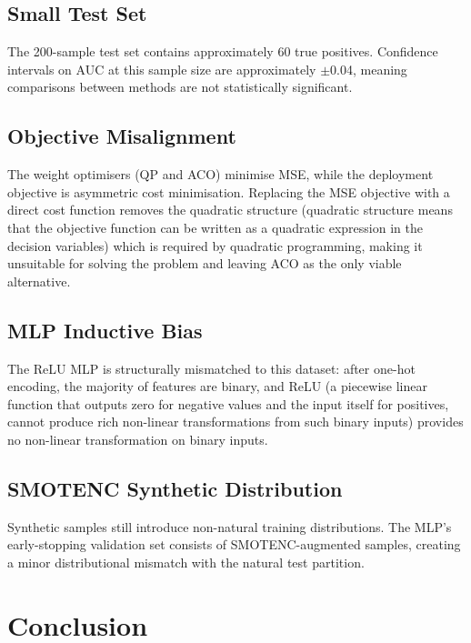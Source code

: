 \documentclass[12pt,a4paper]{article}
\begin{document}
\subsection{Small Test Set}

The 200-sample test set contains approximately 60 true positives. Confidence intervals on AUC at this sample size are approximately $\pm$0.04, meaning comparisons between methods are not statistically significant.

\subsection{Objective Misalignment}

The weight optimisers (QP and ACO) minimise MSE, while the deployment objective is asymmetric cost minimisation. Replacing the MSE objective with a direct cost function removes the quadratic structure (quadratic structure means that the objective function can be written as a quadratic expression in the decision variables) which is required by quadratic programming, making it unsuitable for solving the problem and leaving ACO as the only viable alternative.

\subsection{MLP Inductive Bias}

The ReLU MLP is structurally mismatched to this dataset: after one-hot encoding, the majority of features are binary, and ReLU (a piecewise linear function that outputs zero for negative values and the input itself for positives, cannot produce rich non-linear transformations from such binary inputs) provides no non-linear transformation on binary inputs.
\subsection{SMOTENC Synthetic Distribution}

Synthetic samples still introduce non-natural training distributions. The MLP's early-stopping validation set consists of SMOTENC-augmented samples, creating a minor distributional mismatch with the natural test partition.

\pagebreak
\section{Conclusion}
\end{document}
